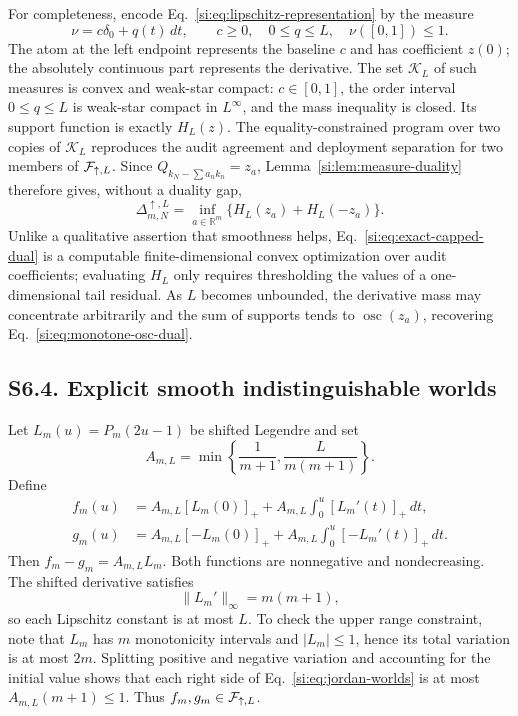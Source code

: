 For completeness, encode Eq.~\ref{si:eq:lipschitz-representation} by the
measure
\begin{equation}
\nu=c\delta_0+q(t)\,dt,\qquad
c\ge0,\quad0\le q\le L,\quad \nu([0,1])\le1.
\label{si:eq:capped-measure-set}
\end{equation}
The atom at the left endpoint represents the baseline $c$ and has coefficient
$z(0)$; the absolutely continuous part represents the derivative. The set
$\mathcal K_L$ of such measures is convex and weak-star compact: $c\in[0,1]$,
the order interval $0\le q\le L$ is weak-star compact in $L^\infty$, and the
mass inequality is closed. Its support function is exactly $H_L(z)$. The
equality-constrained program over two copies of $\mathcal K_L$ reproduces the
audit agreement and deployment separation for two members of
$\mathcal F_{\uparrow,L}$. Since $Q_{k_N-\sum a_nk_n}=z_a$,
Lemma~\ref{si:lem:measure-duality} therefore gives, without a duality gap,
\begin{equation}
\boxed{\Delta^{\uparrow,L}_{m,N}
=\inf_{a\in\mathbb R^m}
\{H_L(z_a)+H_L(-z_a)\}.}
\label{si:eq:exact-capped-dual}
\end{equation}
Unlike a qualitative assertion that smoothness helps, Eq.~\ref{si:eq:exact-capped-dual} is a computable finite-dimensional convex optimization over audit coefficients; evaluating $H_L$ only requires thresholding the values of a one-dimensional tail residual. As $L$ becomes unbounded, the derivative mass may concentrate arbitrarily and the sum of supports tends to $\operatorname{osc}(z_a)$, recovering Eq.~\ref{si:eq:monotone-osc-dual}.

\subsection*{S6.4. Explicit smooth indistinguishable worlds}

Let $L_m(u)=P_m(2u-1)$ be shifted Legendre and set
\begin{equation}
A_{m,L}=\min\left\{\frac1{m+1},\frac{L}{m(m+1)}\right\}.
\label{si:eq:legendre-amplitude}
\end{equation}
Define
\begin{align}
f_m(u)&=A_{m,L}[L_m(0)]_+
+A_{m,L}\int_0^u[L_m'(t)]_+\,dt,\nonumber\\
g_m(u)&=A_{m,L}[-L_m(0)]_+
+A_{m,L}\int_0^u[-L_m'(t)]_+\,dt.
\label{si:eq:jordan-worlds}
\end{align}
Then $f_m-g_m=A_{m,L}L_m$. Both functions are nonnegative and nondecreasing. The shifted derivative satisfies
\begin{equation}
\|L_m'\|_\infty=m(m+1),
\label{si:eq:legendre-derivative}
\end{equation}
so each Lipschitz constant is at most $L$. To check the upper range constraint, note that $L_m$ has $m$ monotonicity intervals and $|L_m|\le1$, hence its total variation is at most $2m$. Splitting positive and negative variation and accounting for the initial value shows that each right side of Eq.~\ref{si:eq:jordan-worlds} is at most $A_{m,L}(m+1)\le1$. Thus $f_m,g_m\in\mathcal F_{\uparrow,L}$.

